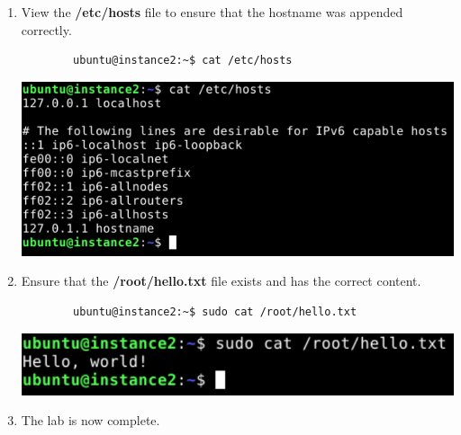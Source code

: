 \documentclass[letterpaper, 12pt]{article}
\begin{document}
\begin{enumerate}
    \item View the \textbf{/etc/hosts} file to ensure that the hostname was appended correctly.
    \begin{lstlisting}
        ubuntu@instance2:~$ cat /etc/hosts
    \end{lstlisting}

    \begin{center}
        \includegraphics[width=\linewidth]{images/part3/step12.png}
    \end{center}

    \item Ensure that the \textbf{/root/hello.txt} file exists and has the correct content.
    \begin{lstlisting}
        ubuntu@instance2:~$ sudo cat /root/hello.txt
    \end{lstlisting}

    \begin{center}
        \includegraphics[width=\linewidth]{images/part3/step13.png}
    \end{center}

    \item The lab is now complete.

\end{enumerate}
\end{document}
